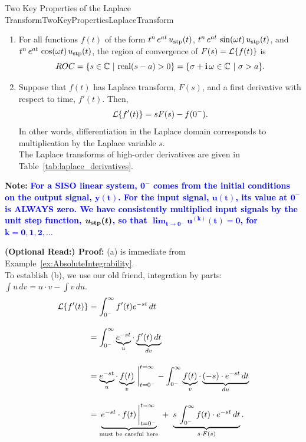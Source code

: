 \begin{propColor}{Two Key Properties of the Laplace Transform}{TwoKeyPropertiesLaplaceTransform}

\begin{enumerate}
\renewcommand{\labelenumi}{(\alph{enumi})}
\setlength{\itemsep}{.2cm}
\item For all functions $f(t)$ of the form $t^n\,e^{at} \, u_{\rm stp}(t)$, $t^n\,e^{at}\, \sin(\omega t) \, u_{\rm stp}(t)$, and $t^n\,e^{at}\, \cos(\omega t) \, u_{\rm stp}(t)$, the region of convergence of $F(s) = {\cal L}\{f(t)\}$ is 
$$ ROC = \{s\in \mathbb C~|~ {\rm real}(s-a)>0\} = \{\sigma + \mathop{\bm{\mathrm i}} \omega \in \mathbb C~|~ \sigma > a\}.$$

\item Suppose that $f(t)$ has Laplace transform, $F(s)$, and a first derivative with respect to time,  $f'(t)$. Then,   $${\cal L}\{f'(t)\} = sF(s) - f(0^-).$$ 
In other words, differentiation in the Laplace domain corresponds to multiplication by the Laplace variable $s$. \\

The Laplace transforms of high-order derivatives are given in Table~\ref{tab:laplace_derivatives}.
    
\end{enumerate}

\textbf{Note:} \textcolor{blue}{\textbf{For a SISO linear system, $\bm{0^{-}}$ comes from the initial conditions on the output signal, $\bm{y(t)}$. For the input signal, $\bm{u(t)}$, its value at $\bm{0^{-}}$ is ALWAYS zero. We have consistently multiplied input signals by the unit step function, $\bm{u_{\rm stp}(t)}$, so that $\displaystyle \bm{\lim_{t \to 0{^-}} u^{(k)}(t) = 0}$, for $\bm{k = 0, 1, 2,\ldots}$}}
    
\end{propColor}

\textbf{(Optional Read:) Proof:} (a) is immediate from Example~\ref{ex:AbsoluteIntegrability}.\\


To establish (b), we use our old friend, integration by parts: $\int u \, dv = u\cdot v - \int v \, du$.
\begin{align*}
    {\cal L}\{f'(t) \} &= \int_{0^-}^\infty f'(t) e^{-st} \, dt \\[1em]
     &= \int_{0^-}^\infty \underbrace{e^{-st}}_{u} \cdot \underbrace{f'(t) \, dt}_{dv} \\[1em]
      &=  \underbrace{e^{-st}}_{u} \cdot \underbrace{f(t)}_{v} \, \bigg|_{t={0^-}}^{t=\infty} - \int_{0^-}^\infty \underbrace{f(t)}_{v} \cdot \underbrace{(-s) \cdot  e^{-st}\, dt}_{du} \\[1em]
      &= \underbrace{ e^{-st} \cdot f(t) \, \bigg|_{t={0^-}}^{t=\infty}}_{\text{must be careful here}} ~+ ~ \underbrace{s\, \int_{0^-}^\infty f(t) \cdot e^{-st}\, dt}_{s \cdot F(s)}. \\[1em]
\end{align*}

